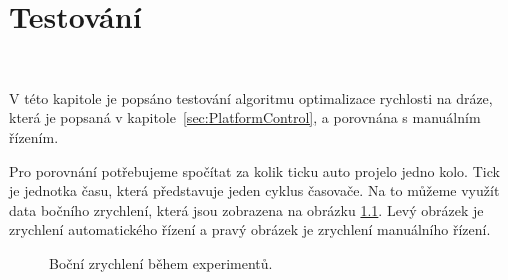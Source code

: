\chapter{Testování}
\label{sec:Testing}
\vspace{-20pt}
\

V této kapitole je popsáno testování algoritmu optimalizace rychlosti na dráze, 
která je popsaná v kapitole~\ref{sec:PlatformControl}, a porovnána s manuálním
řízením. 

Pro porovnání potřebujeme spočítat za kolik ticku auto projelo jedno kolo. Tick je jednotka času, která představuje jeden cyklus časovače.
Na to můžeme využít data bočního zrychlení, která jsou zobrazena na obrázku \ref{fig:Laps}.
Levý obrázek je zrychlení automatického řízení a pravý obrázek je zrychlení 
manuálního řízení.

\begin{figure}[!h]
    \centering
    \caption{Boční zrychlení během experimentů.}
    \label{fig:Laps}
\end{figure}

